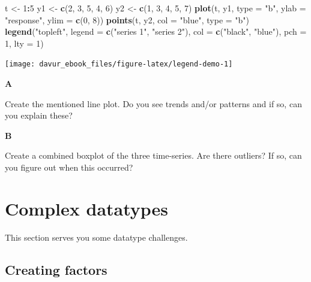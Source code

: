 \documentclass[]{book}
\newenvironment{Shaded}{\begin{snugshade}}{\end{snugshade}}
\newcommand{\DataTypeTok}[1]{\textcolor[rgb]{0.13,0.29,0.53}{#1}}
\newcommand{\DecValTok}[1]{\textcolor[rgb]{0.00,0.00,0.81}{#1}}
\newcommand{\KeywordTok}[1]{\textcolor[rgb]{0.13,0.29,0.53}{\textbf{#1}}}
\newcommand{\NormalTok}[1]{#1}
\newcommand{\OperatorTok}[1]{\textcolor[rgb]{0.81,0.36,0.00}{\textbf{#1}}}
\newcommand{\StringTok}[1]{\textcolor[rgb]{0.31,0.60,0.02}{#1}}
\begin{document}
\begin{Shaded}
\begin{Highlighting}[]
\NormalTok{t <-}\StringTok{ }\DecValTok{1}\OperatorTok{:}\DecValTok{5}
\NormalTok{y1 <-}\StringTok{ }\KeywordTok{c}\NormalTok{(}\DecValTok{2}\NormalTok{, }\DecValTok{3}\NormalTok{, }\DecValTok{5}\NormalTok{, }\DecValTok{4}\NormalTok{, }\DecValTok{6}\NormalTok{)}
\NormalTok{y2 <-}\StringTok{ }\KeywordTok{c}\NormalTok{(}\DecValTok{1}\NormalTok{, }\DecValTok{3}\NormalTok{, }\DecValTok{4}\NormalTok{, }\DecValTok{5}\NormalTok{, }\DecValTok{7}\NormalTok{)}
\KeywordTok{plot}\NormalTok{(t, y1, }\DataTypeTok{type =} \StringTok{"b"}\NormalTok{, }\DataTypeTok{ylab =} \StringTok{"response"}\NormalTok{, }\DataTypeTok{ylim =} \KeywordTok{c}\NormalTok{(}\DecValTok{0}\NormalTok{, }\DecValTok{8}\NormalTok{))}
\KeywordTok{points}\NormalTok{(t, y2, }\DataTypeTok{col =} \StringTok{"blue"}\NormalTok{, }\DataTypeTok{type =} \StringTok{"b"}\NormalTok{)}
\KeywordTok{legend}\NormalTok{(}\StringTok{"topleft"}\NormalTok{, }\DataTypeTok{legend =} \KeywordTok{c}\NormalTok{(}\StringTok{"series 1"}\NormalTok{, }\StringTok{"series 2"}\NormalTok{), }\DataTypeTok{col =} \KeywordTok{c}\NormalTok{(}\StringTok{"black"}\NormalTok{, }\StringTok{"blue"}\NormalTok{), }\DataTypeTok{pch =} \DecValTok{1}\NormalTok{, }\DataTypeTok{lty =} \DecValTok{1}\NormalTok{)}
\end{Highlighting}
\end{Shaded}

\begin{center}\texttt{[image: davur\_ebook\_files/figure-latex/legend-demo-1]} \end{center}

\textbf{A}

Create the mentioned line plot. Do you see trends and/or patterns and if so, can you explain these?

\textbf{B}

Create a combined boxplot of the three time-series. Are there outliers? If so, can you figure out when this occurred?

\hypertarget{complex-datatypes}{%
\section{Complex datatypes}\label{complex-datatypes}}

This section serves you some datatype challenges.

\hypertarget{creating-factors}{%
\subsection{Creating factors}\label{creating-factors}}
\end{document}
